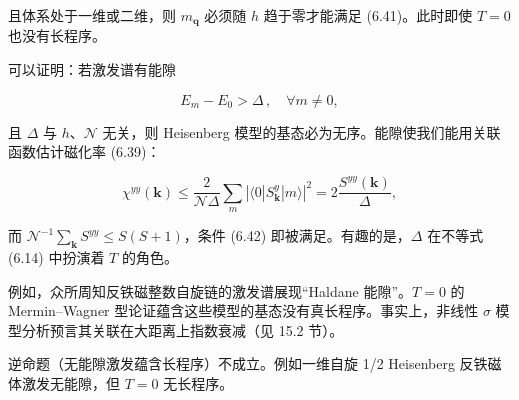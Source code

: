 且体系处于一维或二维，则 $m_{\mathbf{q}}$ 必须随 $h$ 趋于零才能满足 (6.41)。此时即使 $T = 0$ 也没有长程序。

可以证明：若激发谱有能隙

\begin{equation*}
E _ {m} - E _ {0} > \Delta \, , \quad \forall m \neq 0 ,
\tag{6.43}
\end{equation*}

且 $\Delta$ 与 $h$、$\mathcal{N}$ 无关，则 Heisenberg 模型的基态必为无序。能隙使我们能用关联函数估计磁化率 (6.39)：

\begin{equation*}
\chi^ {yy} ( \mathbf {k} ) \leq \frac {2}{\mathcal {N} \Delta} \sum_ {m} \left| \langle 0 | S _ {\mathbf {k}} ^ {y} | m \rangle \right| ^ {2} = 2 \frac {S ^ {yy} ( \mathbf {k} )}{\Delta} ,
\tag{6.44}
\end{equation*}

而 $\mathcal{N}^{-1}\sum_{\mathbf{k}}S^{yy}\leq S(S + 1)$，条件 (6.42) 即被满足。有趣的是，$\Delta$ 在不等式 (6.14) 中扮演着 $T$ 的角色。

例如，众所周知反铁磁整数自旋链的激发谱展现“Haldane 能隙”。$T = 0$ 的 Mermin--Wagner 型论证蕴含这些模型的基态没有真长程序。事实上，非线性 {$\sigma$} 模型分析预言其关联在大距离上指数衰减（见 15.2 节）。

逆命题（无能隙激发蕴含长程序）不成立。例如一维自旋 1/2 Heisenberg 反铁磁体激发无能隙，但 $T = 0$ 无长程序。

